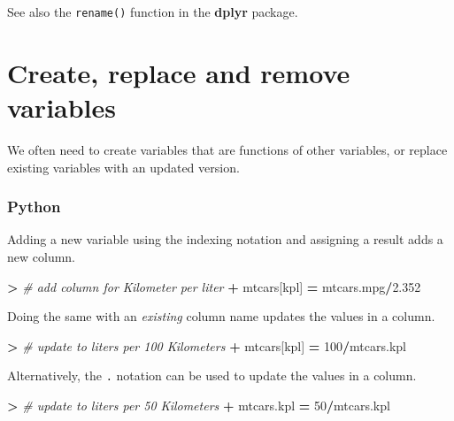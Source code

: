 \documentclass[
]{book}
\newenvironment{Shaded}{\begin{snugshade}}{\end{snugshade}}
\newcommand{\CommentTok}[1]{\textcolor[rgb]{0.56,0.35,0.01}{\textit{#1}}}
\newcommand{\DecValTok}[1]{\textcolor[rgb]{0.00,0.00,0.81}{#1}}
\newcommand{\FloatTok}[1]{\textcolor[rgb]{0.00,0.00,0.81}{#1}}
\newcommand{\NormalTok}[1]{#1}
\newcommand{\OperatorTok}[1]{\textcolor[rgb]{0.81,0.36,0.00}{\textbf{#1}}}
\newcommand{\StringTok}[1]{\textcolor[rgb]{0.31,0.60,0.02}{#1}}
\begin{document}
See also the \texttt{rename()} function in the \textbf{dplyr} package.

\hypertarget{create-replace-and-remove-variables}{%
\section{Create, replace and remove variables}\label{create-replace-and-remove-variables}}

We often need to create variables that are functions of other variables, or replace existing variables with an updated version.

\hypertarget{python-17}{%
\subsubsection*{Python}\label{python-17}}

Adding a new variable using the indexing notation and assigning a result adds a new column.

\begin{Shaded}
\begin{Highlighting}[]
\OperatorTok{\textgreater{}} \CommentTok{\# add column for Kilometer per liter}
\OperatorTok{+}\NormalTok{ mtcars[}\StringTok{\textquotesingle{}kpl\textquotesingle{}}\NormalTok{] }\OperatorTok{=}\NormalTok{ mtcars.mpg}\OperatorTok{/}\FloatTok{2.352}
\end{Highlighting}
\end{Shaded}

Doing the same with an \emph{existing} column name updates the values in a column.

\begin{Shaded}
\begin{Highlighting}[]
\OperatorTok{\textgreater{}} \CommentTok{\# update to liters per 100 Kilometers}
\OperatorTok{+}\NormalTok{ mtcars[}\StringTok{\textquotesingle{}kpl\textquotesingle{}}\NormalTok{] }\OperatorTok{=} \DecValTok{100}\OperatorTok{/}\NormalTok{mtcars.kpl }
\end{Highlighting}
\end{Shaded}

Alternatively, the \texttt{.} notation can be used to update the values in a column.

\begin{Shaded}
\begin{Highlighting}[]
\OperatorTok{\textgreater{}} \CommentTok{\# update to liters per 50 Kilometers}
\OperatorTok{+}\NormalTok{ mtcars.kpl }\OperatorTok{=} \DecValTok{50}\OperatorTok{/}\NormalTok{mtcars.kpl }
\end{Highlighting}
\end{Shaded}
\end{document}
